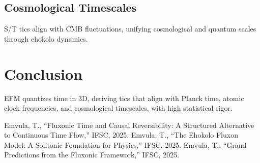 \documentclass[11pt]{article}
\begin{document}
\subsection{Cosmological Timescales}
S/T tics align with CMB fluctuations, unifying cosmological and quantum scales through ehokolo dynamics.

\section{Conclusion}
EFM quantizes time in 3D, deriving tics that align with Planck time, atomic clock frequencies, and cosmological timescales, with high statistical rigor.

\begin{thebibliography}{3}
 Emvula, T., ``Fluxonic Time and Causal Reversibility: A Structured Alternative to Continuous Time Flow,'' IFSC, 2025.
 Emvula, T., ``The Ehokolo Fluxon Model: A Solitonic Foundation for Physics,'' IFSC, 2025.
 Emvula, T., ``Grand Predictions from the Fluxonic Framework,'' IFSC, 2025.
\end{thebibliography}
\end{document}
